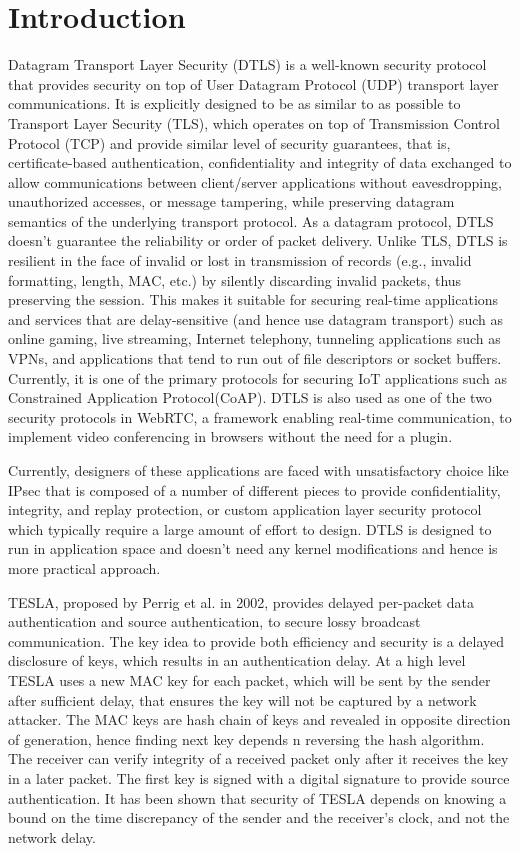 \chapter{Introduction}
\label{intro}
Datagram Transport Layer Security (DTLS)\cite{rescorla2006datagram} is a well-known security protocol that provides security on top of User Datagram Protocol (UDP) transport layer communications. It is explicitly designed to be as similar to as possible to Transport Layer Security (TLS)\cite{rescorla2018transport}, which operates on top of Transmission Control Protocol (TCP) and provide similar level of security guarantees, that is, certificate-based authentication, confidentiality and integrity of data exchanged to allow communications between client/server applications without eavesdropping, unauthorized accesses, or message tampering, while preserving datagram semantics of the underlying transport protocol. As a datagram protocol, DTLS doesn't guarantee the reliability or order of packet delivery. Unlike TLS, DTLS is resilient in the face of invalid or lost in transmission of records (e.g., invalid formatting, length, MAC, etc.) by silently discarding invalid packets, thus preserving the session. This makes it suitable for securing real-time applications and services that are delay-sensitive (and hence use datagram transport) such as online gaming, live streaming, Internet telephony, tunneling applications such as VPNs, and applications that tend to run out of file descriptors or socket buffers. Currently, it is one of the primary protocols for securing IoT applications such as Constrained Application Protocol(CoAP). DTLS is also used as one of the two security protocols in WebRTC, a framework enabling real-time communication, to implement video conferencing in browsers without the need for a plugin.

Currently, designers of these applications are faced with unsatisfactory choice like IPsec\cite{kent1998rfc2401IPSEC} that is composed of a number of different pieces to provide confidentiality, integrity, and replay protection, or custom application layer security protocol which typically require a large amount of effort to design. DTLS is designed to run in application space and doesn’t need any kernel modifications and hence is more practical approach.

TESLA\cite{perrig2002tesla}, proposed by Perrig et al. in 2002, provides delayed per-packet data authentication and source authentication, to secure lossy broadcast communication. The key idea to provide both efficiency and security is a delayed disclosure of keys, which results in an authentication delay. At a high level TESLA uses a new MAC key for each packet, which will be sent by the sender after sufficient delay, that ensures the key will not be captured by a network attacker. The MAC keys are hash chain of keys and revealed in opposite direction of generation, hence finding next key depends n reversing the hash algorithm. The receiver can verify integrity of a received packet only after it receives the key in a later packet. The first key is signed with a digital signature to provide source authentication. It has been shown that security of TESLA depends on knowing a bound on the time discrepancy of the sender and the receiver's clock, and not the network delay.

